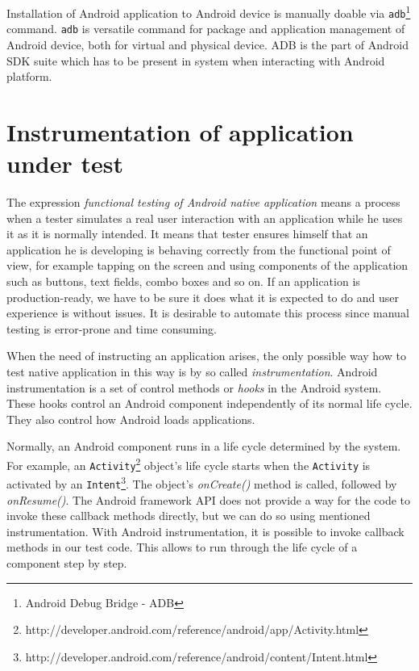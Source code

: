 \documentclass[12pt,final,oneside]{fithesis}
\begin{document}
Installation of Android application to Android device is manually doable via \texttt{adb}\footnote{Android Debug Bridge - ADB} command. \texttt{adb} is versatile command for package and application management of Android device, both for virtual and physical device. ADB is the part of Android SDK suite which has to be present in system when interacting with Android platform.

	\section{Instrumentation of application under test}
	
The expression \textit{functional testing of Android native application} means a process when a tester simulates a real user interaction with an application while he uses it as it is normally intended. It means that tester ensures himself that an application he is developing is behaving correctly from the functional point of view, for example tapping on the screen and using components of the application such as buttons, text fields, combo boxes and so on. If an application is production-ready, we have to be sure it does what it is expected to do and user experience is without issues. It is desirable to automate this process since manual testing is error-prone and time consuming.

When the need of instructing an application arises, the only possible way how to test native application in this way is by so called \textit{instrumentation}. Android instrumentation is a set of control methods or \textit{hooks} in the Android system. These hooks control an Android component independently of its normal life cycle. They also control how Android loads applications.

Normally, an Android component runs in a life cycle determined by the system. For example, an \texttt{Activity}\footnote{http://developer.android.com/reference/android/app/Activity.html} object's life cycle starts when the \texttt{Activity} is activated by an \texttt{Intent}\footnote{http://developer.android.com/reference/android/content/Intent.html}. The object's \textit{onCreate()} method is called, followed by \textit{onResume()}. The Android framework API does not provide a way for the code to invoke these callback methods directly, but we can do so using mentioned instrumentation. With Android instrumentation, it is possible to invoke callback methods in our test code. This allows to run through the life cycle of a component step by step.\cite{bib140}
\end{document}
